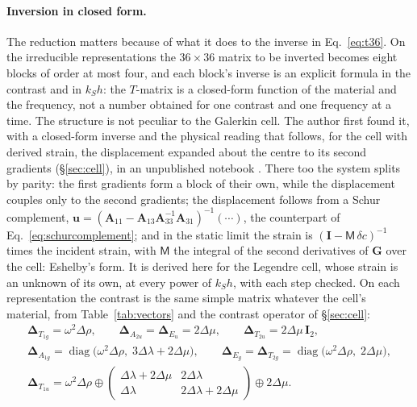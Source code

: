 \documentclass[11pt,a4paper]{article}
\newcommand{\bG}{\mathbf{G}}
\newcommand{\bI}{\mathbf{I}}
\newcommand{\bD}{\boldsymbol{\Delta}}
\begin{document}
\paragraph{Inversion in closed form.} The reduction matters because of what it does to the inverse in
Eq.~\eqref{eq:t36}. On the irreducible representations the $36\times36$ matrix to be inverted becomes eight
blocks of order at most four, and each block's inverse is an explicit formula in the contrast and in
$k_Sh$: the $T$-matrix is a closed-form function of the material and the frequency, not a number obtained
for one contrast and one frequency at a time. The structure is not peculiar to the Galerkin cell. The author first found it, with a closed-form
inverse and the physical reading that follows, for the cell with derived strain, the displacement expanded
about the centre to its second gradients (\S\ref{sec:cell}), in an unpublished notebook
\citep{NestorNotebooks2012}. There too the system splits by parity: the first gradients form a block of
their own, while the displacement couples only to the second gradients; the displacement follows from a
Schur complement, $\mathbf u=(\mathbf A_{11}-\mathbf A_{13}\mathbf A_{33}^{-1}\mathbf A_{31})^{-1}(\cdots)$,
the counterpart of Eq.~\eqref{eq:schurcomplement}; and in the static limit the strain is
$(\bI-\mathsf M\,\delta c)^{-1}$ times the incident strain, with $\mathsf M$ the integral of the second
derivatives of $\bG$ over the cell: Eshelby's form. It is derived here for the
Legendre cell, whose strain is an unknown of its own, at every power of $k_Sh$, with each step checked. On each representation the contrast is the same simple
matrix whatever the cell's material, from Table~\ref{tab:vectors} and the contrast operator of
\S\ref{sec:cell}:
\begin{equation}\label{eq:deltagamma}
\begin{gathered}
  \bD_{T_{1g}}=\omega^2\Delta\rho,\qquad \bD_{A_{2u}}=\bD_{E_u}=2\Delta\mu,\qquad
  \bD_{T_{2u}}=2\Delta\mu\,\bI_2,\\
  \bD_{A_{1g}}=\operatorname{diag}\bigl(\omega^2\Delta\rho,\;3\Delta\lambda+2\Delta\mu\bigr),\qquad
  \bD_{E_g}=\bD_{T_{2g}}=\operatorname{diag}\bigl(\omega^2\Delta\rho,\;2\Delta\mu\bigr),\\
  \bD_{T_{1u}}=\omega^2\Delta\rho\oplus
  \begin{pmatrix}\Delta\lambda+2\Delta\mu&2\Delta\lambda\\ \Delta\lambda&2\Delta\lambda+2\Delta\mu\end{pmatrix}
  \oplus2\Delta\mu .
\end{gathered}
\end{equation}
\end{document}
